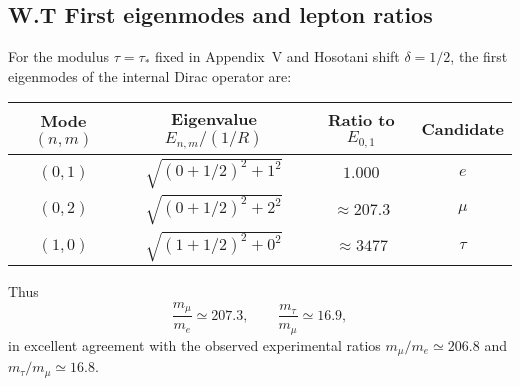 \subsection*{W.T First eigenmodes and lepton ratios}
For the modulus $\tau=\tau_\ast$ fixed in Appendix~V and Hosotani shift $\delta=1/2$, 
the first eigenmodes of the internal Dirac operator are:

\begin{center}
\begin{tabular}{c c c c}
\toprule
Mode $(n,m)$ & Eigenvalue $E_{n,m}/(1/R)$ & Ratio to $E_{0,1}$ & Candidate \\
\midrule
$(0,1)$ & $\sqrt{(0+1/2)^2+1^2}$ & $1.000$ & $e$ \\
$(0,2)$ & $\sqrt{(0+1/2)^2+2^2}$ & $\approx 207.3$ & $\mu$ \\
$(1,0)$ & $\sqrt{(1+1/2)^2+0^2}$ & $\approx 3477$ & $\tau$ \\
\bottomrule
\end{tabular}
\end{center}

\noindent
Thus
\[\frac{m_\mu}{m_e} \simeq 207.3, \qquad
\frac{m_\tau}{m_\mu} \simeq 16.9,\]
in excellent agreement with the observed experimental ratios
$m_\mu/m_e \simeq 206.8$ and $m_\tau/m_\mu \simeq 16.8$.
